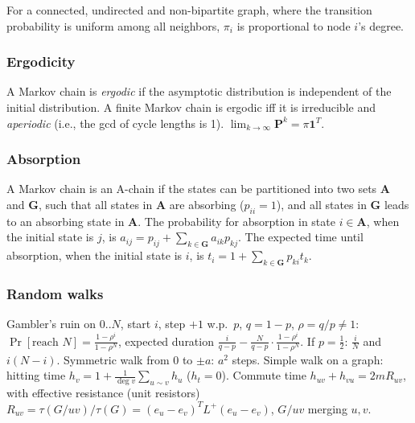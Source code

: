 For a connected, undirected and non-bipartite graph, where the transition probability is uniform among all neighbors, $\pi_i$ is proportional to node $i$'s degree.

\subsubsection{Ergodicity}
A Markov chain is \emph{ergodic} if the asymptotic distribution is independent of the initial distribution.
A finite Markov chain is ergodic iff it is irreducible and \emph{aperiodic} (i.e., the gcd of cycle lengths is 1).
$\lim_{k\rightarrow\infty}\mathbf{P}^k = \pi\mathbf{1}^T$.

\subsubsection{Absorption}
A Markov chain is an A-chain if the states can be partitioned into two sets $\mathbf{A}$ and $\mathbf{G}$, such that all states in $\mathbf{A}$ are absorbing ($p_{ii}=1$), and all states in $\mathbf{G}$ leads to an absorbing state in $\mathbf{A}$.
The probability for absorption in state $i\in\mathbf{A}$, when the initial state is $j$, is $a_{ij} = p_{ij}+\sum_{k\in\mathbf{G}} a_{ik}p_{kj}$.
The expected time until absorption, when the initial state is $i$, is $t_i = 1+\sum_{k\in\mathbf{G}}p_{ki}t_k$.

\subsubsection{Random walks}
Gambler's ruin on $0..N$, start $i$, step $+1$ w.p.\ $p$, $q=1-p$, $\rho=q/p\ne1$: $\Pr[\text{reach }N]=\frac{1-\rho^i}{1-\rho^N}$, expected duration $\frac{i}{q-p}-\frac N{q-p}\cdot\frac{1-\rho^i}{1-\rho^N}$. If $p=\frac12$: $\frac iN$ and $i(N-i)$. Symmetric walk from 0 to $\pm a$: $a^2$ steps.
Simple walk on a graph: hitting time $h_v=1+\frac1{\deg v}\sum_{u\sim v}h_u$ ($h_t=0$). Commute time $h_{uv}+h_{vu}=2mR_{uv}$, with effective resistance (unit resistors) $R_{uv}=\tau(G/uv)/\tau(G)=(e_u-e_v)^TL^+(e_u-e_v)$, $G/uv$ merging $u,v$.
